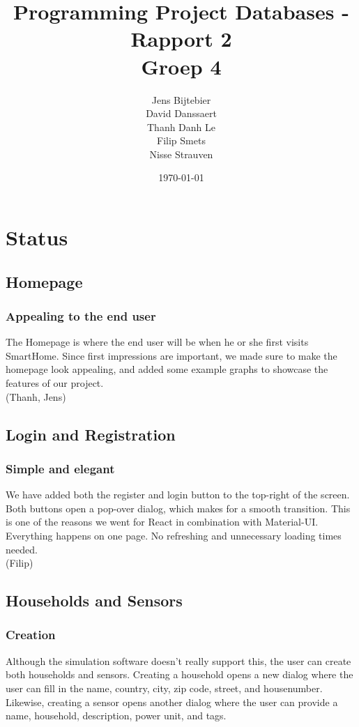 \documentclass[11pt]{article}
\title{\textbf{Programming Project Databases - Rapport 2}\\
		Groep 4}
\author{Jens Bijtebier\\
		David Danssaert\\
		Thanh Danh Le\\
		Filip Smets\\
		Nisse Strauven}
\date{\today}
\begin{document}
\maketitle


\section{Status}
  \subsection{Homepage}
	\subsubsection{Appealing to the end user}
		The Homepage is where the end user will be when he or she first visits SmartHome.
		Since first impressions are important, we made sure to make the homepage look appealing,
		and added some example graphs to showcase the features of our project.\\

		(Thanh, Jens)

  \subsection{Login and Registration}
	\subsubsection{Simple and elegant}
		We have added both the register and login button to the top-right of the screen.
		Both buttons open a pop-over dialog, which makes for a smooth transition.
		This is one of the reasons we went for React in combination with Material-UI.
		Everything happens on one page. No refreshing and unnecessary loading times needed.\\

		(Filip)

  \subsection{Households and Sensors}
	\subsubsection{Creation}
		Although the simulation software doesn't really support this, the user can create both households and sensors.
		Creating a household opens a new dialog where the user can fill in the name, country, city, zip code, street, and housenumber.
		Likewise, creating a sensor opens another dialog where the user can provide a name, household, description, power unit, and tags.\\
\end{document}
